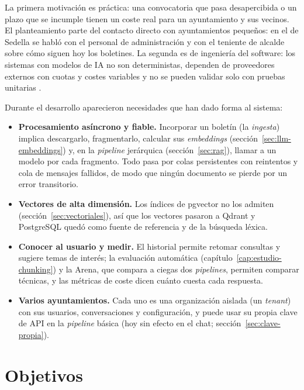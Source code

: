 La primera motivación es práctica: una convocatoria que pasa desapercibida o un plazo que se incumple tienen un coste real para un ayuntamiento y sus vecinos. El planteamiento parte del contacto directo con ayuntamientos pequeños: en el de Sedella se habló con el personal de administración y con el teniente de alcalde sobre cómo siguen hoy los boletines. La segunda es de ingeniería del software: los sistemas con modelos de IA no son deterministas, dependen de proveedores externos con cuotas y costes variables y no se pueden validar solo con pruebas unitarias \cite{ozkaya2020}.

Durante el desarrollo aparecieron necesidades que han dado forma al sistema:
\begin{itemize}
  \item \textbf{Procesamiento asíncrono y fiable.} Incorporar un boletín (la \emph{ingesta}) implica descargarlo, fragmentarlo, calcular sus \emph{embeddings} (sección~\ref{sec:llm-embeddings}) y, en la \emph{pipeline} jerárquica (sección~\ref{sec:rag}), llamar a un modelo por cada fragmento. Todo pasa por colas persistentes con reintentos y cola de mensajes fallidos, de modo que ningún documento se pierde por un error transitorio.
  \item \textbf{Vectores de alta dimensión.} Los índices de pgvector no los admiten (sección~\ref{sec:vectoriales}), así que los vectores pasaron a Qdrant y PostgreSQL quedó como fuente de referencia y de la búsqueda léxica.
  \item \textbf{Conocer al usuario y medir.} El historial permite retomar consultas y sugiere temas de interés; la evaluación automática (capítulo~\ref{cap:estudio-chunking}) y la Arena, que compara a ciegas dos \emph{pipelines}, permiten comparar técnicas, y las métricas de coste dicen cuánto cuesta cada respuesta.
  \item \textbf{Varios ayuntamientos.} Cada uno es una organización aislada (un \emph{tenant}) con sus usuarios, conversaciones y configuración, y puede usar su propia clave de API en la \emph{pipeline} básica (hoy sin efecto en el chat; sección~\ref{sec:clave-propia}).
\end{itemize}


\section{Objetivos}
\label{sec:objetivos}

